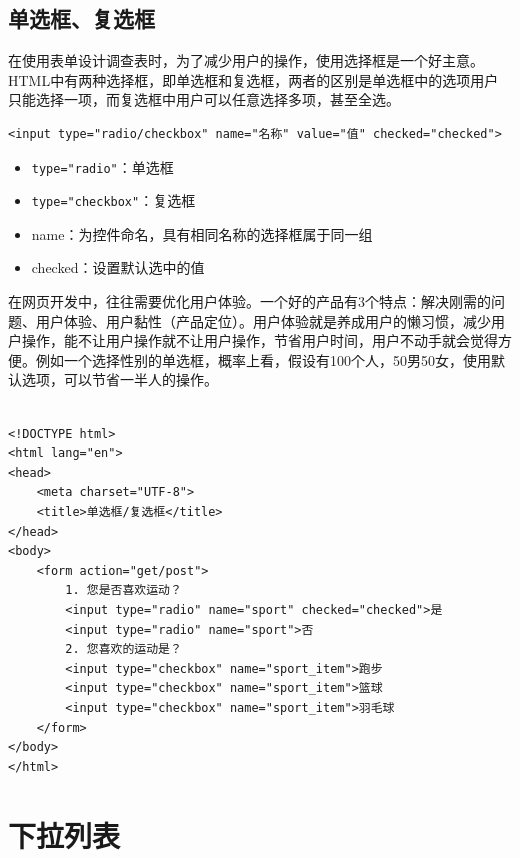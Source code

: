 \subsection{单选框、复选框}

在使用表单设计调查表时，为了减少用户的操作，使用选择框是一个好主意。HTML中有两种选择框，即单选框和复选框，两者的区别是单选框中的选项用户只能选择一项，而复选框中用户可以任意选择多项，甚至全选。 \\

\begin{lstlisting}[style=htmlcssjs]
<input type="radio/checkbox" name="名称" value="值" checked="checked">
\end{lstlisting}

\begin{itemize}
	\item \lstinline|type="radio"|：单选框
	\item \lstinline|type="checkbox"|：复选框
	\item name：为控件命名，具有相同名称的选择框属于同一组
	\item checked：设置默认选中的值
\end{itemize}

在网页开发中，往往需要优化用户体验。一个好的产品有3个特点：解决刚需的问题、用户体验、用户黏性（产品定位）。用户体验就是养成用户的懒习惯，减少用户操作，能不让用户操作就不让用户操作，节省用户时间，用户不动手就会觉得方便。例如一个选择性别的单选框，概率上看，假设有100个人，50男50女，使用默认选项，可以节省一半人的操作。 \\

 \\
\begin{lstlisting}[style=htmlcssjs]
<!DOCTYPE html>
<html lang="en">
<head>
    <meta charset="UTF-8">
    <title>单选框/复选框</title>
</head>
<body>
    <form action="get/post">
        1. 您是否喜欢运动？
        <input type="radio" name="sport" checked="checked">是
        <input type="radio" name="sport">否
        2. 您喜欢的运动是？
        <input type="checkbox" name="sport_item">跑步
        <input type="checkbox" name="sport_item">篮球
        <input type="checkbox" name="sport_item">羽毛球
    </form>
</body>
</html>
\end{lstlisting}

\newpage

\section{下拉列表}

